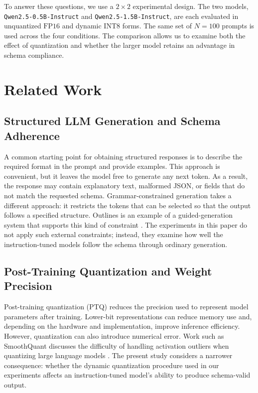 \documentclass[10pt, conference, a4paper]{IEEEtran}
\begin{document}
To answer these questions, we use a $2 \times 2$ experimental design. The two models, \texttt{Qwen2.5-0.5B-Instruct} and \texttt{Qwen2.5-1.5B-Instruct}, are each evaluated in unquantized $\text{FP16}$ and dynamic $\text{INT8}$ forms. The same set of $N=100$ prompts is used across the four conditions. The comparison allows us to examine both the effect of quantization and whether the larger model retains an advantage in schema compliance.

\section{Related Work}

\subsection{Structured LLM Generation and Schema Adherence}
A common starting point for obtaining structured responses is to describe the required format in the prompt and provide examples. This approach is convenient, but it leaves the model free to generate any next token. As a result, the response may contain explanatory text, malformed JSON, or fields that do not match the requested schema. Grammar-constrained generation takes a different approach: it restricts the tokens that can be selected so that the output follows a specified structure. Outlines is an example of a guided-generation system that supports this kind of constraint \cite{outlines}. The experiments in this paper do not apply such external constraints; instead, they examine how well the instruction-tuned models follow the schema through ordinary generation.

\subsection{Post-Training Quantization and Weight Precision}
Post-training quantization (PTQ) reduces the precision used to represent model parameters after training. Lower-bit representations can reduce memory use and, depending on the hardware and implementation, improve inference efficiency. However, quantization can also introduce numerical error. Work such as SmoothQuant discusses the difficulty of handling activation outliers when quantizing large language models \cite{smoothquant}. The present study considers a narrower consequence: whether the dynamic quantization procedure used in our experiments affects an instruction-tuned model's ability to produce schema-valid output.
\end{document}
